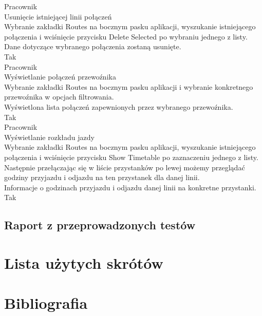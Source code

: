 \documentclass[10pt,a4paper]{article}
\begin{document}
Pracownik\\
Usunięcie istniejącej linii połączeń\\
Wybranie zakładki Routes na bocznym pasku aplikacji, wyszukanie istniejącego połączenia i wciśnięcie przycisku Delete Selected po wybraniu jednego z listy.\\
Dane dotyczące wybranego połączenia zostaną usunięte.\\
Tak\\

Pracownik\\
Wyświetlanie połączeń przewoźnika\\
Wybranie zakładki Routes na bocznym pasku aplikacji i wybranie konkretnego przewoźnika w opcjach filtrowania.\\
Wyświetlona lista połączeń zapewnionych przez wybranego przewoźnika.\\
Tak\\

Pracownik\\
Wyświetlanie rozkładu jazdy\\
Wybranie zakładki Routes na bocznym pasku aplikacji, wyszukanie istniejącego połączenia i wciśnięcie przycisku Show Timetable po zaznaczeniu jednego z listy. Następnie przełączając się w liście przystanków po lewej możemy przeglądać godziny przyjazdu i odjazdu na ten przystanek dla danej linii.\\
Informacje o godzinach przyjazdu i odjazdu danej linii na konkretne przystanki.\\
Tak\\

\subsection{Raport z przeprowadzonych testów}

\section{Lista użytych skrótów}

\renewcommand*{\refname}{\vspace*{-2em}}
\section{Bibliografia}
\begin{thebibliography}{99}
\end{thebibliography}
\end{document}
